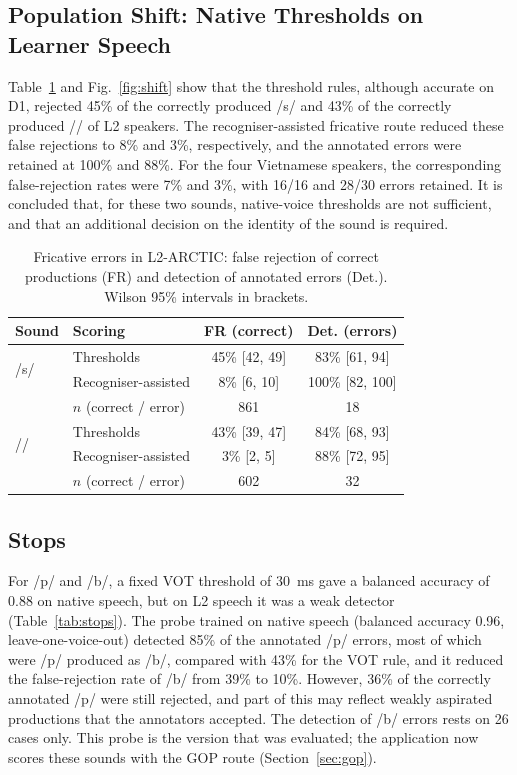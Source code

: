 \documentclass[conference]{IEEEtran}
\newcommand{\ipa}[1]{/#1/}
\begin{document}
\subsection{Population Shift: Native Thresholds on Learner Speech}
Table~\ref{tab:l2} and Fig.~\ref{fig:shift} show that the threshold rules, although accurate on D1, rejected 45\% of the correctly produced \ipa{s} and 43\% of the correctly produced \ipa{\textesh} of L2 speakers. The recogniser-assisted fricative route reduced these false rejections to 8\% and 3\%, respectively, and the annotated errors were retained at 100\% and 88\%. For the four Vietnamese speakers, the corresponding false-rejection rates were 7\% and 3\%, with 16/16 and 28/30 errors retained. It is concluded that, for these two sounds, native-voice thresholds are not sufficient, and that an additional decision on the identity of the sound is required.

\begin{table}[!htb]
\caption{Fricative errors in L2-ARCTIC: false rejection of correct productions (FR) and detection of annotated errors (Det.). Wilson 95\% intervals in brackets.}
\label{tab:l2}
\centering
\small
\begin{tabular}{llcc}
\toprule
Sound & Scoring & FR (correct) & Det. (errors) \\
\midrule
\multirow{2}{*}{\ipa{s}} & Thresholds & 45\% [42, 49] & 83\% [61, 94] \\
 & Recogniser-assisted & 8\% [6, 10] & 100\% [82, 100] \\
 & \scriptsize{$n$ (correct / error)} & \scriptsize{861} & \scriptsize{18} \\
\midrule
\multirow{2}{*}{\ipa{\textesh}} & Thresholds & 43\% [39, 47] & 84\% [68, 93] \\
 & Recogniser-assisted & 3\% [2, 5] & 88\% [72, 95] \\
 & \scriptsize{$n$ (correct / error)} & \scriptsize{602} & \scriptsize{32} \\
\bottomrule
\end{tabular}
\end{table}

\subsection{Stops}
For \ipa{p} and \ipa{b}, a fixed VOT threshold of 30~ms gave a balanced accuracy of 0.88 on native speech, but on L2 speech it was a weak detector (Table~\ref{tab:stops}). The probe trained on native speech (balanced accuracy 0.96, leave-one-voice-out) detected 85\% of the annotated \ipa{p} errors, most of which were \ipa{p} produced as \ipa{b}, compared with 43\% for the VOT rule, and it reduced the false-rejection rate of \ipa{b} from 39\% to 10\%. However, 36\% of the correctly annotated \ipa{p} were still rejected, and part of this may reflect weakly aspirated productions that the annotators accepted. The detection of \ipa{b} errors rests on 26 cases only. This probe is the version that was evaluated; the application now scores these sounds with the GOP route (Section~\ref{sec:gop}).
\end{document}
